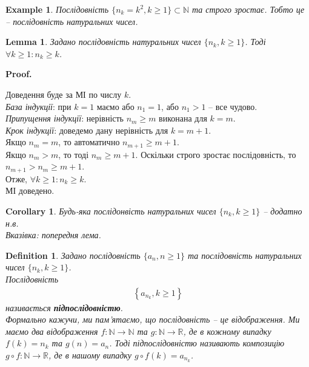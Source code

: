 \documentclass[a4paper, 14pt]{article}
\makeatletter
\def\qed{$\blacksquare$}
\theoremstyle{theoremdd}
\theoremstyle{theoremdd}
\newtheorem{definition}[theorem]{Definition}
\theoremstyle{theoremdd}
\theoremstyle{theoremdd}
\newtheorem{example}[theorem]{Example}
\theoremstyle{theoremdd}
\theoremstyle{theoremdd}
\theoremstyle{theoremdd}
\newtheorem{lemma}[theorem]{Lemma}
\theoremstyle{theoremdd}
\newtheorem{corollary}[theorem]{Corollary}
\renewenvironment{proof}[1][Proof.\\]{\par
\pushQED{\hfill \qed}%
\normalfont \topsep6\p@\@plus6\p@\relax
\trivlist
\item\relax
{\bfseries
#1\@addpunct{.}}\hspace\labelsep\ignorespaces
}{%
\popQED\endtrivlist\@endpefalse
}
\makeatother
\begin{document}
	\begin{example}
	Послідовність $\{n_k = k^2, k \geq 1\} \subset \mathbb{N}$ та строго зростає. Тобто це -- послідовність натуральних чисел.
	\end{example}
	
	\begin{lemma}
	Задано послідовність натуральних чисел $\{n_k, k \geq 1\}$. Тоді $\forall k \geq 1: n_k \geq k$.
	\end{lemma}
	
	\begin{proof}
	Доведення буде за МІ по числу $k$.\\
	\textit{База індукції}: при $k = 1$ маємо або $n_1 = 1$, або $n_1 > 1$ -- все чудово.\\
	\textit{Припущення індукції}: нерівність $n_m \geq m$ виконана для $k=m$.\\
	\textit{Крок індукції}: доведемо дану нерівність для $k=m+1$.\\
	Якщо $n_m = m$, то автоматично $n_{m+1} \geq m+1$.\\
	Якщо $n_m > m$, то тоді $n_m \geq m+1$. Оскільки строго зростає послідовність, то $n_{m+1} > n_m \geq m+1$.\\
	Отже, $\forall k \geq 1: n_k \geq k$. \\
	МІ доведено.
	\end{proof}
	
	\begin{corollary}
	Будь-яка послідонвість натуральних чисел $\{n_k, k \geq 1\}$ -- додатно н.в.\\
	\textit{Вказівка: попередня лема.}
	\end{corollary}
	
	\begin{definition}
	Задано послідовність $\{a_n, n \geq 1\}$ та послідовність натуральних чисел $\{n_k, k \geq 1\}$.\\
	Послідовність
	\begin{align*}
	\left\{a_{n_k}, k \geq 1\right\}
	\end{align*}
	називається \textbf{підпослідовністю}.\\
	Формально кажучи, ми пам'ятаємо, що послідовність -- це відображення. Ми маємо два відображення $f \colon \mathbb{N} \to \mathbb{N}$ та $g \colon \mathbb{N} \to \mathbb{R}$, де в кожному випадку $f(k) = n_k$ та $g(n) = a_n$. Тоді підпослідовністю називають композицію $g \circ f \colon \mathbb{N} \to \mathbb{R}$, де в нашому випадку $g \circ f (k) = a_{n_k}$.
	\end{definition}
	
\end{document}
